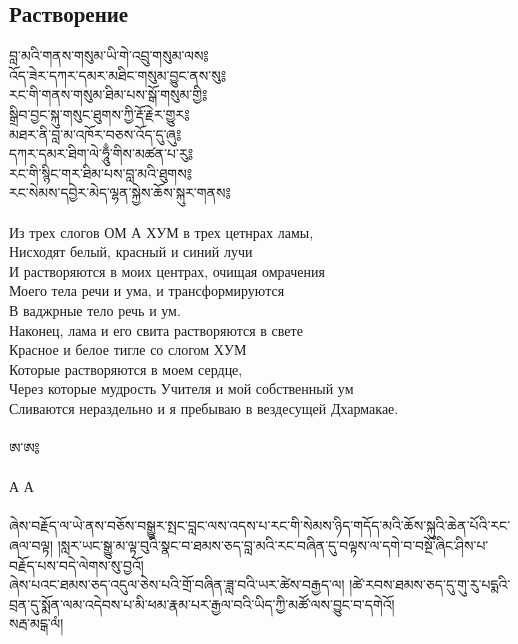 \subsection{Растворение}
\ti
བླ་མའི་གནས་གསུམ་ཡི་གེ་འབྲུ་གསུམ་ལས༔\\
འོད་ཟེར་དཀར་དམར་མཐིང་གསུམ་བྱུང་ནས་སུ༔\\
རང་གི་གནས་གསུམ་ཐིམ་པས་སྒོ་གསུམ་གྱི༔\\
སྒྲིབ་བྱང་སྐུ་གསུང་ཐུགས་ཀྱི་རྡོ་རྗེར་གྱུར༔\\
མཐར་ནི་བླ་མ་འཁོར་བཅས་འོད་དུ་ཞུ༔\\
དཀར་དམར་ཐིག་ལེ་ཧཱུྃ་གིས་མཚན་པ་རུ༔\\
རང་གི་སྙིང་གར་ཐིམ་པས་བླ་མའི་ཐུགས༔\\
རང་སེམས་དབྱེར་མེད་ལྷན་སྐྱེས་ཆོས་སྐུར་གནས༔\\
\\
\ru
Из трех слогов ОМ А ХУМ в трех цетнрах ламы,\\
Нисходят белый, красный и синий лучи\\
И растворяются в моих центрах, очищая омрачения\\
Моего тела речи и ума, и трансформируются\\
В ваджрные тело речь и ум.\\
Наконец, лама и его свита растворяются в свете\\
Красное и белое тигле со слогом ХУМ\\
Которые растворяются в моем сердце,\\
Через которые мудрость Учителя и мой собственный ум\\
Сливаются нераздельно и я пребываю в вездесущей Дхармакае.\\
\\
\ti ཨ་ཨ༔\\
\\
\ru А А \\
\\
\scriptsize
\ti ཞེས་བརྗོད་ལ་ཡེ་ནས་བཅོས་བསྒྱུར་སྤང་བླང་ལས་འདས་པ་རང་གི་སེམས་ཉིད་གདོད་མའི་ཆོས་སྐུའི་ཆེན་པོའི་རང་ཞལ་བལྟ། །སླར་ཡང་སྒྱུ་མ་ལྟ་བུའི་སྣང་བ་ཐམས་ཅད་བླ་མའི་རང་བཞིན་དུ་བལྟས་ལ་དགེ་བ་བསྔོ་ཞིང་ཤིས་པ་བརྗོད་པས་བདེ་ལེགས་སུ་བྱའོ།\\
ཞེས་པའང་ཐམས་ཅད་འདུལ་ཅེས་པའི་གྲོ་བཞིན་ཟླ་བའི་ཡར་ཚེས་བརྒྱད་ལ། །ཚེ་རབས་ཐམས་ཅད་དུ་གུ་རུ་པདྨའི་བྲན་དུ་སྨོན་ལམ་འདེབས་པ་མི་ཕམ་རྣམ་པར་རྒྱལ་བའི་ཡིད་ཀྱི་མཚོ་ལས་བྱུང་བ་དགེའོ།\\
སརྦ་མངྒ་ལཾ།\\
\\
\ru
\\
\normalsize
